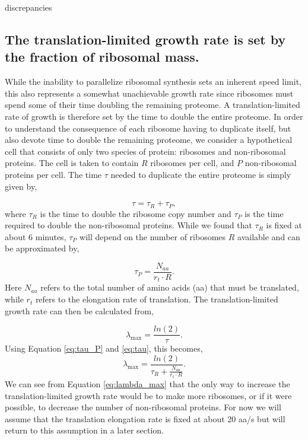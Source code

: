 discrepancies \documentclass[11pt, letterpaper]{article}
\begin{document}
\subsection{The translation-limited growth rate is set by the fraction of
ribosomal mass.}

While the inability to parallelize ribosomal synthesis sets an inherent speed
limit, this also represents a somewhat unachievable growth rate since ribosomes must
spend some of their time doubling the remaining proteome. A
translation-limited rate of growth is therefore set by the time to double the
entire proteome. In order to understand the consequence of each ribosome having
to duplicate itself, but also devote time to double the remaining proteome, we
consider a hypothetical cell that consists of only two species of protein:
ribosomes and non-ribosomal proteins. The cell is taken to contain $R$ ribosomes
per cell, and $P$ non-ribosomal proteins per cell. The time $\tau$ needed to
duplicate the entire proteome is simply given by,



\begin{equation}
	\tau = \tau_R + \tau_P,
\label{eq:tau}
\end{equation}
where $\tau_R$ is the time to double the ribosome copy number and $\tau_P$ is the time
required to double the non-ribosomal proteins. While we found that $\tau_R$ is fixed
at about 6 minutes,  $\tau_P$  will depend on the number of ribosomes $R$ available and
can be approximated by,

\begin{equation}
\tau_P = \frac{N_{aa}}{r_t \cdot R}.
\label{eq:tau_P}
\end{equation}
Here $N_{aa}$ refers to the total number of amino acids (aa) that must be
translated, while $r_t$ refers to the elongation rate of translation.
The translation-limited growth rate can then be calculated from,

\begin{equation}
\lambda_{\text{max}} =  \frac{ln(2)} {\tau}.
\end{equation}
Using Equation \ref{eq:tau_P} and \ref{eq:tau}, this becomes,
\begin{equation}
\lambda_{\text{max}} =  \frac{ln(2)} {\tau_R + \frac{N_{aa}}{r_t \cdot R}}.
\label{eq:lambda_max}
\end{equation}
We can see from Equation \ref{eq:lambda_max} that the only way to increase the
translation-limited growth rate would be to make more ribosomes, or if it were
possible, to decrease the number of non-ribosomal proteins. For now we will assume
that the translation elongation rate is fixed at about 20 aa/s but will return to this
assumption in a later section.
\end{document}
